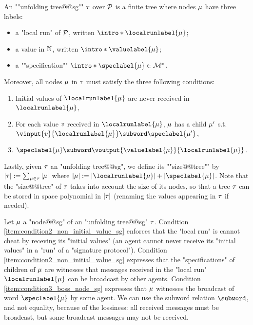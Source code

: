 \begin{definition}
\label{def:unfolding_tree_signature}
\AP An ""unfolding tree@@sg"" $\tau$ over $\mathcal{P}$ is
a finite tree where nodes $\mu$ have three labels:
\begin{itemize}
	\item a "local run" of $\mathcal{P}$, written $\intro*\localrunlabel{\node}$;
	
	\item a value in $\mathbb{N}$, written $\intro*\valuelabel{\node}$;
	
	\item a ""specification"" $\intro*\speclabel{\node} \in \messages^*$.
\end{itemize} 
Moreover, all nodes $\mu$ in $\tau$ must satisfy the three following conditions:
\begin{enumerate}[label= (\roman*), ref=(\roman*)]
	\item \label{item:condition1_initial_value_sg} Initial values of $\localrunlabel{\node}$ are never received in $\localrunlabel{\node}$,
	\item \label{item:condition2_non_initial_value_sg} For each value $v$ received in $\localrunlabel{\node}$, $\mu$ has a child $\mu'$ s.t. $\vinput{\aval}{\localrunlabel{\node}} \subword \speclabel{\node'}$,
	\item \label{item:condition3_boss_node_sg} $\speclabel{\node} \subword \voutput{\valuelabel{\node}}{\localrunlabel{\node}}$.
\end{enumerate}

\AP Lastly, given $\tau$ an "unfolding tree@@sg", we define its ""size@@tree"" by $|\tau| := \sum_{\mu \in \tau} |\mu|$ where $\size{\node} := \size{\localrunlabel{\node}} + \size{\speclabel{\node}}$. Note that the "size@@tree" of $\tau$ takes into account the size of its nodes, so that a tree $\tau$ can be stored in space polynomial in $|\tau|$ (renaming the values appearing in $\tau$ if needed). 
\end{definition}
Let $\mu$ a "node@@sg" of an "unfolding tree@@sg" $\tau$. Condition \ref{item:condition2_non_initial_value_sg} enforces that the "local run" is cannot cheat by receving its "initial values" (an agent cannot never receive its "initial values" in a "run" of a "signature protocol"). 
Condition \ref{item:condition2_non_initial_value_sg} expresses that the "specifications" of children of $\mu$ are witnesses that messages received in the "local run" $\localrunlabel{\node}$ can be broadcast by other agents. Condition \ref{item:condition3_boss_node_sg} expresses that $\mu$ witnesses the broadcast of word $\speclabel{\node}$ by some agent. We can use the subword relation $\subword$, and not equality, because of the lossiness: all received messages must be broadcast, but some broadcast messages may not be received.  

